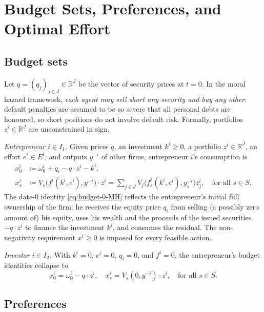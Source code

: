 \documentclass[11pt,a4paper,oneside]{book}
\def\R{\mathbb{R}}
\def\geq{\geqslant}
\theoremstyle{plain}
\theoremstyle{definition}
\theoremstyle{remark}
\numberwithin{equation}{chapter}
\begin{document}
\section{Budget Sets, Preferences, and Optimal Effort}
\label{sec:MH-budgets}

\subsection{Budget sets}

Let $q = (q_j)_{j \in J} \in \R^J$ be the vector of security prices at $t=0$.
In the moral hazard framework, \emph{each agent may sell short any security and buy any other}: default penalties are assumed to be so severe that all personal debts are honoured, so short positions do not involve default risk.
Formally, portfolios $z^i \in \R^J$ are unconstrained in sign.

\emph{Entrepreneur $i \in I_1$.}
Given prices $q$, an investment $k^i \geq 0$, a portfolio $z^i \in \R^J$, an effort $e^i \in E^i$, and outputs $y^{-i}$ of other firms, entrepreneur $i$'s consumption is
\begin{align}
  x^i_0
  &\coloneqq \omega^i_0 + q_i - q \cdot z^i - k^i,
  \label{eq:budget-0-MH}\\[2pt]
  x^i_s
  &\coloneqq V_s\bigl( f^i(k^i, e^i), y^{-i} \bigr) \cdot z^i
  = \sum_{j \in J} V_j\bigl( f^i_s(k^i, e^i), y^{-i}_s \bigr) z^i_j,
  \quad \text{for all $s\in S$}.
  \label{eq:budget-s-MH}
\end{align}
The date-$0$ identity \eqref{eq:budget-0-MH} reflects the entrepreneur's initial full ownership of the firm: he receives the equity price $q_i$ from selling (a possibly zero amount of) his equity, uses his wealth and the proceeds of the issued securities $-q \cdot z^i$ to finance the investment $k^i$, and consumes the residual.
The non-negativity requirement $x^i \geq 0$ is imposed for every feasible action.

\emph{Investor $i \in I_2$.}
With $k^i = 0$, $e^i = 0$, $q_i = 0$, and $f^i = 0$, the entrepreneur's budget identities collapse to
\begin{equation*}
  x^i_0 = \omega^i_0 - q \cdot z^i, \quad
  x^i_s = V_s(0, y^{-i}) \cdot z^i, \quad \text{for all $s\in S$}.
\end{equation*}

\subsection{Preferences}
\end{document}
